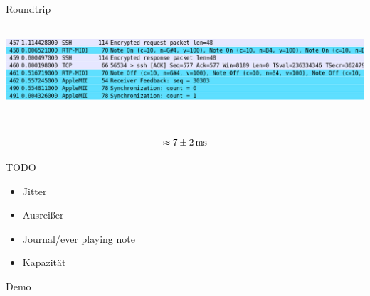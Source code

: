\begin{frame}{Roundtrip}
	\includegraphics[height=4cm]{img/wire.jpg}
	
	\[\approx 7\pm2\text{\,ms}\]
	
\end{frame}

\begin{frame}{TODO}
	\begin{itemize}
		\item Jitter
		\item Ausreißer
		\item Journal/ever playing note
		\item Kapazität
	\end{itemize}
\end{frame}

\begin{frame}
	\centering
	\Huge Demo
\end{frame}
